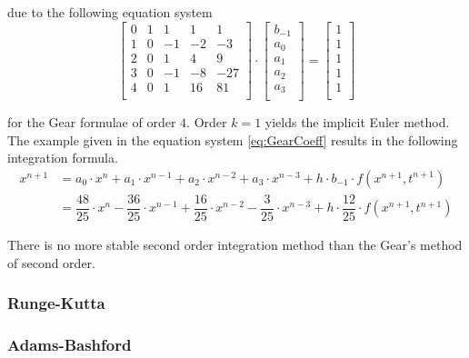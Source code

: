\documentclass[10pt]{report}
\begin{document}
due to the following equation system
\begin{equation}
\label{eq:GearCoeff}
\begin{bmatrix}
0 & 1 & 1 & 1 & 1\\
1 & 0 & -1 & -2 & -3\\
2 & 0 & 1 & 4 & 9 \\
3 & 0 & -1 & -8 & -27\\
4 & 0 & 1 & 16 & 81\\
\end{bmatrix}
\cdot
\begin{bmatrix}
b_{-1}\\
a_0\\
a_1\\
a_2\\
a_3\\
\end{bmatrix}
=
\begin{bmatrix}
1\\
1\\
1\\
1\\
1\\
\end{bmatrix}
\end{equation}

for the Gear formulae of order $4$.  Order $k = 1$ yields the implicit
Euler method.  The example given in the equation system
\eqref{eq:GearCoeff} results in the following integration formula.
\begin{equation}
\label{eq:GearInt}
\begin{split}
x^{n+1} &= a_0\cdot x^{n} + a_1\cdot x^{n-1} + a_2\cdot x^{n-2} + a_3\cdot x^{n-3} + h\cdot b_{-1}\cdot f(x^{n+1}, t^{n+1})\\
&= \dfrac{48}{25}\cdot x^{n} - \dfrac{36}{25}\cdot x^{n-1} + \dfrac{16}{25}\cdot x^{n-2} - \dfrac{3}{25}\cdot x^{n-3} + h\cdot \dfrac{12}{25}\cdot f(x^{n+1}, t^{n+1})
\end{split}
\end{equation}

There is no more stable second order integration method than the
Gear's method of second order.

\subsubsection{Runge-Kutta}

\subsubsection{Adams-Bashford}
\end{document}

